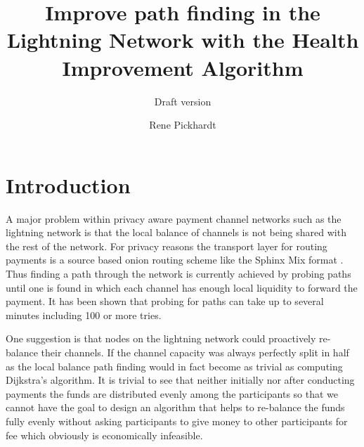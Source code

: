 \documentclass[a4paper]{paper}
\title{Improve path finding in the Lightning Network with the Health Improvement Algorithm}
\subtitle{Draft version}
\author{Rene Pickhardt}
\begin{document}
 

\section{Introduction}
A major problem within privacy aware payment channel networks such as the lightning network is that the local balance of channels is not being shared with the rest of the network.
For privacy reasons the transport layer for routing payments is a source based onion routing scheme like the Sphinx Mix format \cite{danezis2009sphinx}.
Thus finding a path through the network is currently achieved by probing paths until one is found in which each channel has enough local liquidity to forward the payment.
It has been shown that probing for paths can take up to several minutes including 100 or more tries.\cite{decker2019lnconf}

One suggestion is that nodes on the lightning network could proactively re-balance their channels.
If the channel capacity was always perfectly split in half as the local balance path finding would in fact become as trivial as computing Dijkstra's algorithm.
It is trivial to see that neither initially nor after conducting payments the funds are distributed evenly among the participants so that we cannot have the goal to design an algorithm that helps to re-balance the funds fully evenly without asking participants to give money to other participants for fee which obviously is economically infeasible. 
\end{document}
